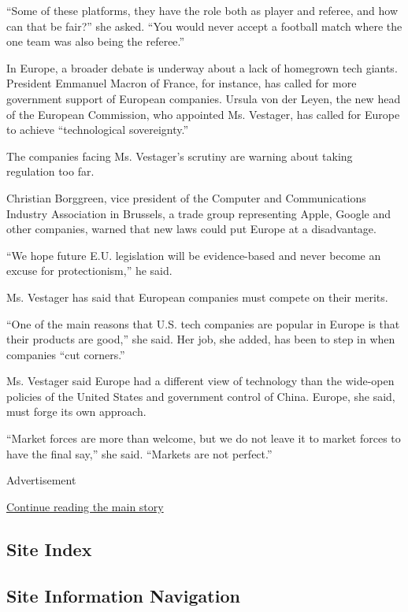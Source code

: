 ``Some of these platforms, they have the role both as player and
referee, and how can that be fair?'' she asked. ``You would never accept
a football match where the one team was also being the referee.''

In Europe, a broader debate is underway about a lack of homegrown tech
giants. President Emmanuel Macron of France, for instance, has called
for more government support of European companies. Ursula von der Leyen,
the new head of the European Commission, who appointed Ms. Vestager, has
called for Europe to achieve ``technological sovereignty.''

The companies facing Ms. Vestager's scrutiny are warning about taking
regulation too far.

Christian Borggreen, vice president of the Computer and Communications
Industry Association in Brussels, a trade group representing Apple,
Google and other companies, warned that new laws could put Europe at a
disadvantage.

``We hope future E.U. legislation will be evidence-based and never
become an excuse for protectionism,'' he said.

Ms. Vestager has said that European companies must compete on their
merits.

``One of the main reasons that U.S. tech companies are popular in Europe
is that their products are good,'' she said. Her job, she added, has
been to step in when companies ``cut corners.''

Ms. Vestager said Europe had a different view of technology than the
wide-open policies of the United States and government control of China.
Europe, she said, must forge its own approach.

``Market forces are more than welcome, but we do not leave it to market
forces to have the final say,'' she said. ``Markets are not perfect.''

Advertisement

\protect\hyperlink{after-bottom}{Continue reading the main story}

\hypertarget{site-index}{%
\subsection{Site Index}\label{site-index}}

\hypertarget{site-information-navigation}{%
\subsection{Site Information
Navigation}\label{site-information-navigation}}

